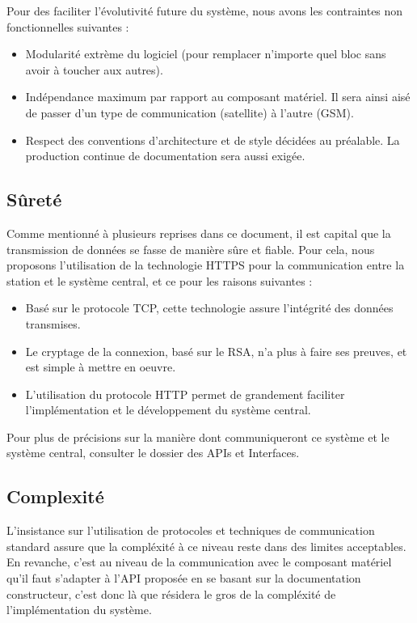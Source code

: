 Pour des faciliter l'évolutivité future du système, nous avons les contraintes non fonctionnelles suivantes :

\begin{itemize}
\item Modularité extrème du logiciel (pour remplacer n'importe quel bloc sans avoir à toucher aux autres).
\item Indépendance maximum par rapport au composant matériel. Il sera ainsi aisé de passer d'un type de communication (satellite) à l'autre (GSM).
\item Respect des conventions d'architecture et de style décidées au préalable. La production continue de documentation sera aussi exigée.
\end{itemize}

\subsection{Sûreté}

Comme mentionné à plusieurs reprises dans ce document, il est capital que la transmission de données se fasse de manière sûre et fiable. Pour cela, nous proposons l'utilisation de la technologie HTTPS pour la communication entre la station et le système central, et ce pour les raisons suivantes :

\begin{itemize}
\item Basé sur le protocole TCP, cette technologie assure l'intégrité des données transmises.
\item Le cryptage de la connexion, basé sur le RSA, n'a plus à faire ses preuves, et est simple à mettre en oeuvre.
\item L'utilisation du protocole HTTP permet de grandement faciliter l'implémentation et le développement du système central.
\end{itemize}

Pour plus de précisions sur la manière dont communiqueront ce système et le système central, consulter le dossier des APIs et Interfaces.

\subsection{Complexité}

L'insistance sur l'utilisation de protocoles et techniques de communication standard assure que la compléxité à ce niveau reste dans des limites acceptables. En revanche, c'est au niveau de la communication avec le composant matériel qu'il faut s'adapter à l'API proposée en se basant sur la documentation constructeur, c'est donc là que résidera le gros de la compléxité de l'implémentation du système.

